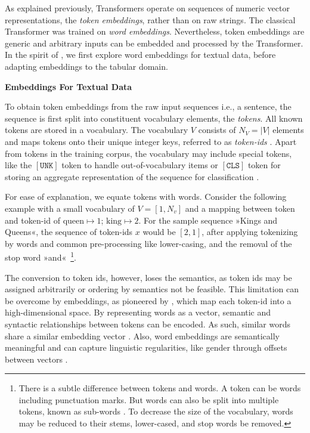 As explained previously, Transformers operate on sequences of numeric vector representations, the \emph{token embeddings}, rather than on raw strings.  The classical Transformer was trained on \emph{word embeddings}. Nevertheless, token embeddings are generic and arbitrary inputs can be embedded and processed by the Transformer. In the spirit of \textcite[][5]{vaswaniAttentionAllYou2017}, we first explore word embeddings for textual data, before adapting embeddings to the tabular domain.

\textbf{Embeddings For Textual Data}

To obtain token embeddings from the raw input sequences i.e., a sentence, the sequence is first split into constituent vocabulary elements, the \emph{tokens}. All known tokens are stored in a vocabulary. The vocabulary $V$ consists of $N_{V}=|V|$ elements and maps tokens onto their unique integer keys, referred to as \emph{token-ids} \autocite[][3]{phuongFormalAlgorithmsTransformers2022}. Apart from tokens in the training corpus, the vocabulary may include special tokens, like the $\mathtt{[UNK]}$ token to handle out-of-vocabulary items or $\mathtt{[CLS]}$ token for storing an aggregate representation of the sequence for classification \autocite[cp.][4]{devlinBERTPretrainingDeep2019}.

For ease of explanation, we equate tokens with words. Consider the following example with a small vocabulary of $V=[1, N_v]$ and a mapping between token and token-id of $\text{queen}\mapsto 1$; $\text{king}\mapsto 2$. For the sample sequence »Kings and Queens«, the sequence of token-ids $x$ would be $[2, 1]$, after applying tokenizing by words and common pre-processing like lower-casing, and the removal of the stop word »and«~\footnote{There is a subtle difference between tokens and words. A token can be words including punctuation marks. But words can also be split into multiple tokens, known as sub-words \autocite[][3]{bojanowskiEnrichingWordVectors2017}. To decrease the size of the vocabulary, words may be reduced to their stems, lower-cased, and stop words be removed.}.

The conversion to token ids, however, loses the semantics, as token ids may be assigned arbitrarily or ordering by semantics not be feasible. This limitation can be overcome by embeddings, as pioneered by \textcite[][1139]{bengioNeuralProbabilisticLanguage}, which map each token-id into a high-dimensional space. By representing words as a vector, semantic and syntactic relationships between tokens can be encoded. As such, similar words share a similar embedding vector \autocite[][1139]{bengioNeuralProbabilisticLanguage}. Also, word embeddings are semantically meaningful and can capture linguistic regularities, like gender through offsets between vectors \autocite[][748--749]{mikolovLinguisticRegularitiesContinuous2013}.

